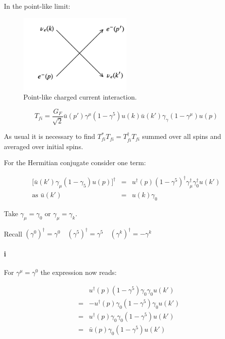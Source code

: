 In the point-like limit:

\begin{figure}[!htb]
  \begin{center}
    \includegraphics[width=0.5\textwidth]{images/web_feynman/image_46.png}
    \caption[Point-like charged current interaction]{Point-like charged current interaction.}
    \label{fig:ch12_chargedCurrentInteractionPointlike}
  \end{center}
\end{figure}

\[
  T_{fi} = \frac{G_F}{\sqrt{2}}\bar{u}(p')\gamma^{\mu}\left(1 - \gamma^5\right)u(k)\bar{u}(k')\gamma_{\gamma}\left(1 - \gamma^{\mu}\right)u(p)
\]

As usual it is necessary to find $T_{fi}^* T_{fi} = T_{fi}^{\dagger}T_{fi}$ summed over all spins and averaged over initial spins.

For the Hermitian conjugate consider one term:

\begin{eqnarray*}
  \Big[ \bar{u}(k')\gamma_{\mu}\left(1 - \gamma_5\right) u(p)\Big]^{\dagger} & = & u^{\dagger}(p)\left(1 - \gamma^5\right)^{\dagger}\gamma_{\mu}^{\dagger}\gamma_0^{\dagger}u(k') \\
  \textrm{as } \bar{u}(k') & = & u(k)\gamma_0
\end{eqnarray*}

Take $\gamma_{\mu} = \gamma_0$ or $\gamma_{\mu} = \gamma_k$.

Recall $\left(\gamma^0\right)^{\dagger} = \gamma^0 \quad \left(\gamma^5\right)^{\dagger} = \gamma^5 \quad \left(\gamma^k\right)^{\dagger} = -\gamma^k$

\paragraph{i} For $\gamma^{\mu} = \gamma^0$ the expression now reads:

\begin{eqnarray*}
  && u^{\dagger}(p)\left(1 - \gamma^5\right)\gamma_0\gamma_0u(k') \\
  & = & -u^{\dagger}(p)\gamma_0\left(1 - \gamma^5\right)\gamma_0u(k') \\
  & = & u^{\dagger}(p)\gamma_0\gamma_0\left(1 - \gamma^5\right)u(k') \\
  & = & \bar{u}(p)\gamma_0\left(1 - \gamma^5\right)u(k')
\end{eqnarray*}

